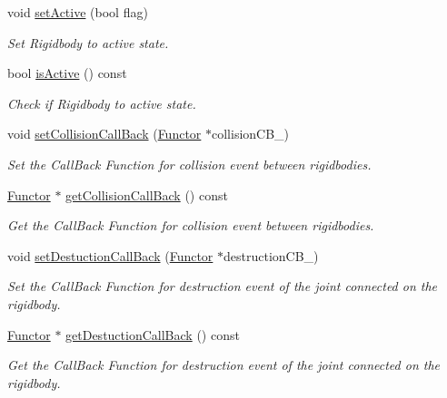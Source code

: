 \begin{DoxyCompactItemize}
void \hyperlink{class_magnum_1_1_physics3_1_1_rigid_body_aac67aa35da21da620d00bcf72cbfafdb}{set\+Active} (bool flag)
\begin{DoxyCompactList}\small\item\em Set Rigidbody to active state. \end{DoxyCompactList}\item 
bool \hyperlink{class_magnum_1_1_physics3_1_1_rigid_body_a97ee4ffe184bf5f24613f9e3d557dcf3}{is\+Active} () const 
\begin{DoxyCompactList}\small\item\em Check if Rigidbody to active state. \end{DoxyCompactList}\item 
void \hyperlink{class_magnum_1_1_physics3_1_1_rigid_body_ad8ec622663b4e808aa63146ba4275fa3}{set\+Collision\+Call\+Back} (\hyperlink{class_magnum_1_1_functor}{Functor} $\ast$collision\+C\+B\+\_\+)
\begin{DoxyCompactList}\small\item\em Set the Call\+Back Function for collision event between rigidbodies. \end{DoxyCompactList}\item 
\hyperlink{class_magnum_1_1_functor}{Functor} $\ast$ \hyperlink{class_magnum_1_1_physics3_1_1_rigid_body_af9ee6fb6c05a4229d6ea22fbf44c8d53}{get\+Collision\+Call\+Back} () const 
\begin{DoxyCompactList}\small\item\em Get the Call\+Back Function for collision event between rigidbodies. \end{DoxyCompactList}\item 
void \hyperlink{class_magnum_1_1_physics3_1_1_rigid_body_a1fed2f75129db6ae27a6a9c4e25d54b8}{set\+Destuction\+Call\+Back} (\hyperlink{class_magnum_1_1_functor}{Functor} $\ast$destruction\+C\+B\+\_\+)
\begin{DoxyCompactList}\small\item\em Set the Call\+Back Function for destruction event of the joint connected on the rigidbody. \end{DoxyCompactList}\item 
\hyperlink{class_magnum_1_1_functor}{Functor} $\ast$ \hyperlink{class_magnum_1_1_physics3_1_1_rigid_body_a0ff48b66c0dc89d2b337d68bc29db029}{get\+Destuction\+Call\+Back} () const 
\begin{DoxyCompactList}\small\item\em Get the Call\+Back Function for destruction event of the joint connected on the rigidbody. \end{DoxyCompactList}\item 

\end{DoxyCompactItemize}
